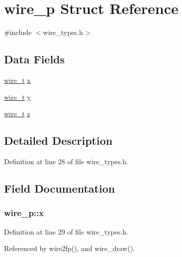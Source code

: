 \hypertarget{structwire__p}{}\section{wire\+\_\+p Struct Reference}
\label{structwire__p}


{\ttfamily \#include $<$wire\+\_\+types.\+h$>$}

\subsection*{Data Fields}
\begin{DoxyCompactItemize}
\item 
\hyperlink{wire__types_8h_ace84d5e6e326f6a52d978bd9900baee6}{wire\+\_\+t} \hyperlink{structwire__p_a7a555c323bd3699ff2db08a3b3e791ed}{x}
\item 
\hyperlink{wire__types_8h_ace84d5e6e326f6a52d978bd9900baee6}{wire\+\_\+t} \hyperlink{structwire__p_a32b151309922af59db0cafea09e77b67}{y}
\item 
\hyperlink{wire__types_8h_ace84d5e6e326f6a52d978bd9900baee6}{wire\+\_\+t} \hyperlink{structwire__p_a423cfb83825fc447478c866e4c2f6520}{z}
\end{DoxyCompactItemize}


\subsection{Detailed Description}


Definition at line 28 of file wire\+\_\+types.\+h.



\subsection{Field Documentation}
\subsubsection[{\texorpdfstring{x}{x}}]{ wire\+\_\+p\+::x}\hypertarget{structwire__p_a7a555c323bd3699ff2db08a3b3e791ed}{}\label{structwire__p_a7a555c323bd3699ff2db08a3b3e791ed}


Definition at line 29 of file wire\+\_\+types.\+h.



Referenced by wire2fp(), and wire\+\_\+draw().

